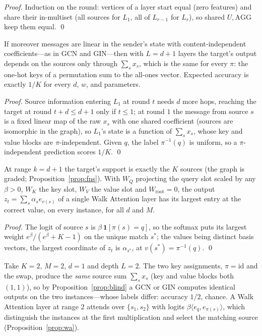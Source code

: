 \documentclass[runningheads]{llncs}
\begin{document}
\begin{proof}
Induction on the round: vertices of a layer start equal (zero features) and
share their in-multiset (all sources for $L_1$, all of $L_{r-1}$ for $L_r$), so
shared $U,\mathrm{AGG}$ keep them equal. \qed
\end{proof}

\begin{proposition}\label{prop:blind}
If moreover messages are linear in the sender's state with content-independent
coefficients---as in GCN and GIN---then with $L=d+1$ layers the target's output
depends on the sources only through $\sum_s x_s$, which is the same for every
$\pi$: the one-hot keys of a permutation sum to the all-ones vector. Expected
accuracy is exactly $1/K$ for every $d$, $w$, and parameters.
\end{proposition}

\begin{proof}
Source information entering $L_1$ at round $t$ needs $d$ more hops, reaching
the target at round $t+d\le d+1$ only if $t\le1$; at round $1$ the message from
source $s$ is a fixed linear map of the raw $x_s$ with one shared coefficient
(sources are isomorphic in the graph), so $L_1$'s state is a function of
$\sum_s x_s$, whose key and value blocks are $\pi$-independent. Given $q$, the
label $\pi^{-1}(q)$ is uniform, so a $\pi$-independent prediction scores $1/K$.
\qed
\end{proof}

\begin{proposition}\label{prop:wa}
At range $k=d+1$ the target's support is exactly the $K$ sources (the graph is
graded; Proposition~\ref{prop:fns}). With $W_Q$ projecting the query slot
scaled by any $\beta>0$, $W_K$ the key slot, $W_V$ the value slot and
$W_{\!\text{root}}=0$, the output $z_t=\sum_s\alpha_s e_{v(s)}$ of a single
Walk Attention layer has its largest entry at the correct value, on every
instance, for all $d$ and $M$.
\end{proposition}

\begin{proof}
The logit of source $s$ is $\beta\,\mathbf{1}[\pi(s)=q]$, so the softmax puts
its largest weight $e^{\beta}/(e^{\beta}+K-1)$ on the unique match $s^\ast$;
the values being distinct basis vectors, the largest coordinate of $z_t$ is
$\alpha_{s^\ast}$, at $v(s^\ast)=\pi^{-1}(q)$. \qed
\end{proof}

\begin{example}\label{ex:blind}
Take $K=2$, $M=2$, $d=1$ and depth $L=2$. The two key assignments,
$\pi=\mathrm{id}$ and the swap, produce the \emph{same} source sum
$\sum_s x_s$ (key and value blocks both $(1,1)$), so by
Proposition~\ref{prop:blind} a GCN or GIN computes identical outputs on the two
instances---whose labels differ: accuracy $1/2$, chance. A Walk Attention layer
at range $2$ attends over $\{s_1,s_2\}$ with logits
$\beta\langle e_q,e_{\pi(s)}\rangle$, which distinguish the instances at the
first multiplication and select the matching source
(Proposition~\ref{prop:wa}).
\end{example}
\end{document}
